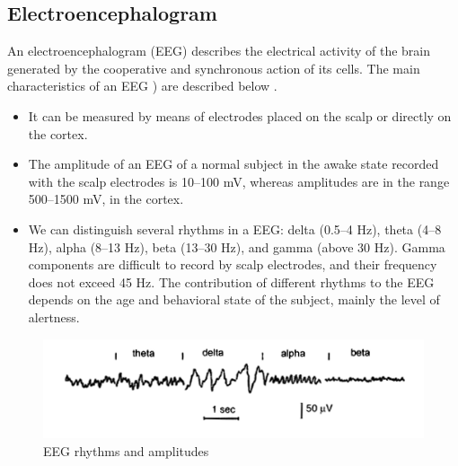 


\subsection{Electroencephalogram}
\label{subsec:setup:phys-signals:eeg}

An electroencephalogram (EEG) describes the electrical activity of the
brain generated by the cooperative and synchronous action of its
cells. The main characteristics of an EEG ) are
described below \cite{blinowska2006eeg}.
\begin{itemize}

	\item It can be measured by means of electrodes placed on the
	scalp or directly on the cortex.

	\item The amplitude of an EEG of a normal subject in the awake
	state recorded with the scalp electrodes is 10–100 mV, whereas
	amplitudes are in the range 500–1500 mV, in the cortex.

	\item We can distinguish several rhythms in a EEG: delta
	(0.5–4 Hz), theta (4–8 Hz), alpha (8–13 Hz), beta (13–30 Hz),
	and gamma (above 30 Hz). Gamma components are difficult to
	record by scalp electrodes, and their frequency does not
	exceed 45 Hz. The contribution of different rhythms to the EEG
	depends on the age and behavioral state of the subject, mainly
	the level of alertness.
\end{itemize}

\begin{figure}[!ht]
\centering
\includegraphics[width=\textwidth]{images/EEGrhythms.png}
\caption{EEG rhythms and amplitudes}
\label{fig:EEGrhythms}
\end{figure}



